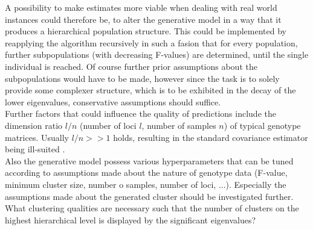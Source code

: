 \documentclass[a4paper, 11pt]{article}
\begin{document}
A possibility to make estimates more viable when dealing with real world instances could therefore be, to alter the generative model in a way that it produces a hierarchical population structure. This could be implemented by reapplying the algorithm recursively in such a fasion that for every population, further subpopulations (with decreasing F-values) are determined, until the single individual is reached. Of course further prior assumptions about the subpopulations would have to be made, however since the task is to solely provide some complexer structure, which is to be exhibited in the decay of the lower eigenvalues, conservative assumptions should suffice.\\
Further factors that could influence the quality of predictions include the dimension ratio $l/n$ (number of loci $l$, number of samples $n$) of typical genotype matrices. Usually $l/n >> 1$ holds, resulting in the standard covariance estimator being ill-suited \parencite{ledoit2004well, schafer2005shrinkage}.\\
Also the generative model possess various hyperparameters that can be tuned according to assumptions made about the nature of genotype data (F-value, minimum cluster size, number o samples, number of loci, ...). Especially the assumptions made about the generated cluster should be investigated further. What clustering qualities are necessary such that the number of clusters on the highest hierarchical level is displayed by the significant eigenvalues?

\printbibliography
\end{document}
